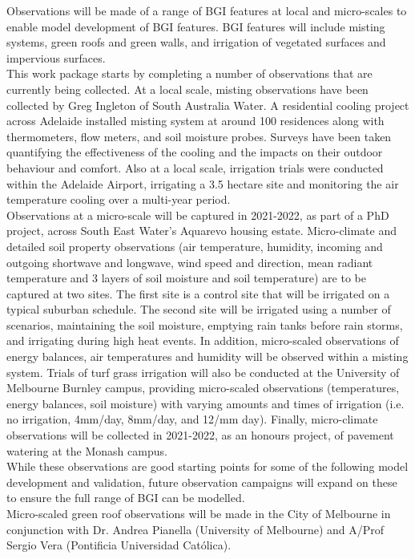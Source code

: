 Observations will be made of a range of BGI features at local and micro-scales to enable model development of BGI features. BGI features will include misting systems, green roofs and green walls, and irrigation of vegetated surfaces and impervious surfaces. 
\\[6pt]
This work package starts by completing a number of observations that are currently being collected. At a local scale, misting observations have been collected by Greg Ingleton of South Australia Water. A residential cooling project across Adelaide installed misting system at around 100 residences along with thermometers, flow meters, and soil moisture probes. Surveys have been taken quantifying the effectiveness of the cooling and the impacts on their outdoor behaviour and comfort. Also at a local scale, irrigation trials were conducted within the Adelaide Airport, irrigating a 3.5 hectare site and monitoring the air temperature cooling over a multi-year period\cite{CRCWCS2018,Ingleton2020,Qian2020}. 
\\[6pt]
Observations at a micro-scale will be captured in 2021-2022, as part of a PhD project, across South East Water's Aquarevo housing estate. Micro-climate and detailed soil property observations (air temperature, humidity, incoming and outgoing shortwave and longwave, wind speed and direction, mean radiant temperature and 3 layers of soil moisture and soil temperature) are  to be captured at two sites. The first site is a control site that will be irrigated on a typical suburban schedule. The second site will be irrigated using a number of scenarios, maintaining the soil moisture, emptying rain tanks before rain storms, and irrigating during high heat events. In addition, micro-scaled observations of energy balances, air temperatures and humidity will be observed within a misting system. Trials of turf grass irrigation will also be conducted at the University of Melbourne Burnley campus, providing micro-scaled observations (temperatures, energy balances, soil moisture) with varying amounts and times of irrigation (i.e. no irrigation, 4mm/day, 8mm/day, and 12/mm day). Finally, micro-climate observations will be collected in 2021-2022, as an honours project, of pavement watering at the Monash campus.
\\[6pt]
While these observations are good starting points for some of the following model development and validation, future observation campaigns will expand on these to ensure the full range of BGI can be modelled. 
\\[6pt]
Micro-scaled green roof observations will be made in the City of Melbourne in conjunction with Dr. Andrea Pianella (University of Melbourne) and A/Prof Sergio Vera (Pontificia Universidad Cat\'{o}lica). 
